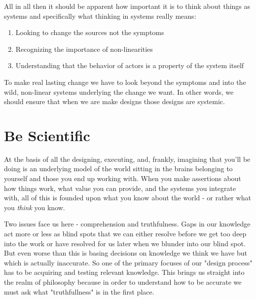 \documentclass[11pt,a5paper]{book}
\begin{document}
All in all then it should be apparent how important it is to think about things as systems and specifically what thinking in systems really means:

\begin{enumerate}
\item Looking to change the sources not the symptoms
\item Recognizing the importance of non-linearities
\item Understanding that the behavior of actors is a property of the system itself
\end{enumerate}

To make real lasting change we have to look beyond the symptoms and into the wild, non-linear systems underlying the change we want. In other words, we should ensure that when we are make designs those designs are systemic.  

\section{Be Scientific}
At the basis of all the designing, executing, and, frankly, imagining that you'll be doing is an underlying model of the world sitting in the brains belonging to yourself and those you end up working with. When you make assertions about how things work, what value you can provide, and the systems you integrate with, all of this is founded upon what you know about the world - or rather what you \textit{think} you know. 
\newline

Two issues face us here - comprehension and truthfulness. Gaps in our knowledge act more or less as blind spots that we can either resolve before we get too deep into the work or have resolved for us later when we blunder into our blind spot. But even worse than this is basing decisions on knowledge we think we have but which is actually inaccurate. So one of the primary focuses of our "design process" has to be acquiring and testing relevant knowledge. This brings us straight into the realm of philosophy because in order to understand how to be accurate we must ask what "truthfullness" is in the first place.
\end{document}

